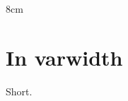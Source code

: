 \documentclass{article}
\begin{document}
\begin{varwidth}{8cm}
\section{In varwidth}
Short.
\end{varwidth}

\end{document}
